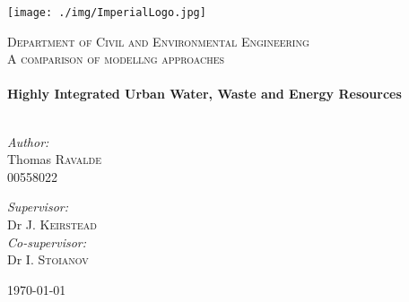 \begin{titlepage}


\texttt{[image: ./img/ImperialLogo.jpg]}\\[1cm]

\begin{center}

\textsc{\large Department of Civil and Environmental Engineering}\\[1.5cm]

\textsc{\Large A comparison of modellng approaches}\\[0.5cm]

\HRule \\[0.4cm]
{ \LARGE \bfseries Highly Integrated Urban Water, Waste and Energy Resources}\\[0.4cm]

\HRule \\[1.5cm]

\begin{minipage}{0.5\textwidth}
\begin{flushleft} \large
\emph{Author:}\\
Thomas \textsc{Ravalde}\\
00558022 \\
\end{flushleft}
\end{minipage}
\begin{minipage}{0.4\textwidth}
\begin{flushright} \large
\emph{Supervisor:} \\
Dr J. \textsc{Keirstead} \\
\emph{Co-supervisor:} \\
Dr I. \textsc{Stoianov} \\
\end{flushright}
\end{minipage}

\vfill

{\today}

\end{center}

\end{titlepage}
